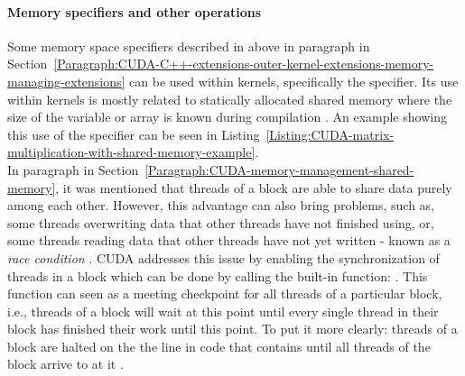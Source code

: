 \paragraph{Memory specifiers and other operations}
Some memory space specifiers described in above in paragraph \textit{} in Section~\ref{Paragraph:CUDA-C++-extensions-outer-kernel-extensions-memory-managing-extensions} can be used within kernels, specifically the  specifier. Its use within kernels is mostly related to statically allocated shared memory where the size of the variable or array is known during compilation \cite{NVIDIAMay2022}. An example showing this use of the specifier can be seen in Listing~\ref{Listing:CUDA-matrix-multiplication-with-shared-memory-example}. \\
In paragraph \textit{} in Section~\ref{Paragraph:CUDA-memory-management-shared-memory}, it was mentioned that threads of a block are able to share data purely among each other. However, this advantage can also bring problems, such as, some threads overwriting data that other threads have not finished using, or, some threads reading data that other threads have not yet written - known as a \textit{race condition} \cite{Harris28January2013}. CUDA addresses this issue by enabling the synchronization of threads in a block which can be done by calling the built-in function: . This function can seen as a meeting checkpoint for all threads of a particular block, i.e., threads of a block will wait at this point until every single thread in their block has finished their work until this point. To put it more clearly: threads of a block are halted on the the line in code that contains  until all threads of the block arrive to at it \cite{NVIDIAMay2022}.


